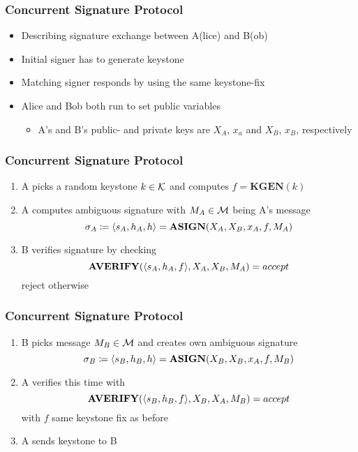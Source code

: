 \begin{frame}
	\frametitle{Concurrent Signature Protocol}

	\begin{itemize}
		\item Describing signature exchange between A(lice) and B(ob)
		\item Initial signer has to generate keystone
		\item Matching signer responds by using the same keystone-fix
		\item Alice and Bob both run \setup to set public variables
			\begin{itemize}
				\item A's and B's public- and private keys are $X_A$, $x_a$ and $X_B$, $x_B$, respectively
			\end{itemize}
	\end{itemize}
\end{frame}

\begin{frame}
	\frametitle{Concurrent Signature Protocol}

	\begin{enumerate}
		\item A picks a random keystone $k\in\mathcal{K}$ and computes $f = \textbf{KGEN}(k)$
		\item A computes ambiguous signature with $M_A \in \mathcal{M}$ being A's message 
			$$\sigma_A \coloneqq \langle s_A,h_A,h \rangle = \textbf{ASIGN}(X_A, X_B, x_A, f, M_A)$$ 
		\item B verifies signature by checking
			$$\textbf{AVERIFY}(\langle s_A, h_A, f \rangle, X_A, X_B, M_A) = accept$$
			reject otherwise
		\setcounter{ResumeEnumerate}{\value{enumi}}
	\end{enumerate}
\end{frame}


\begin{frame}
	\frametitle{Concurrent Signature Protocol}

	\begin{enumerate}[start=\numexpr\value{ResumeEnumerate}+1]
		\item B picks message $M_B \in \mathcal{M}$ and creates own ambiguous signature
		$$\sigma_B \coloneqq \langle s_B,h_B,h \rangle = \textbf{ASIGN}(X_B, X_B, x_A, f, M_B)$$
		\item A verifies this time with
			$$\textbf{AVERIFY}(\langle s_B, h_B, f \rangle, X_B, X_A, M_B) = accept$$
			with $f$ same keystone fix as before
		\item A sends keystone to B
	\end{enumerate}
\end{frame}